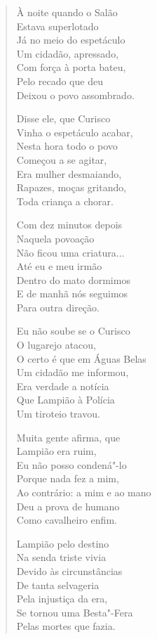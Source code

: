 \begin{verse}
À noite quando o Salão \\
Estava superlotado \\
Já no meio do espetáculo \\
Um cidadão, apressado, \\
Com força à porta bateu, \\
Pelo recado que deu \\
Deixou o povo assombrado. 
\pagebreak

Disse ele, que Curisco \\
Vinha o espetáculo acabar, \\
Nesta hora todo o povo \\
Começou a se agitar, \\
Era mulher desmaiando, \\
Rapazes, moças gritando, \\
Toda criança a chorar. 

Com dez minutos depois \\
Naquela povoação \\
Não ficou uma criatura... \\
Até eu e meu irmão \\
Dentro do mato dormimos \\
E de manhã nós seguimos \\
Para outra direção. 

Eu não soube se o Curisco \\
O lugarejo atacou, \\
O certo é que em Águas Belas \\
Um cidadão me informou, \\
Era verdade a notícia \\
Que Lampião à Polícia \\
Um tiroteio travou. 

Muita gente afirma, que \\
Lampião era ruim, \\
Eu não posso condená"-lo \\
Porque nada fez a mim, \\
Ao contrário: a mim e ao mano \\
Deu a prova de humano \\
Como cavalheiro enfim. 
\pagebreak

Lampião pelo destino \\
Na senda triste vivia \\
Devido às circunstâncias \\
De tanta selvageria \\
Pela injustiça da era, \\
Se tornou uma Besta"-Fera \\
Pelas mortes que fazia. 


\end{verse}
